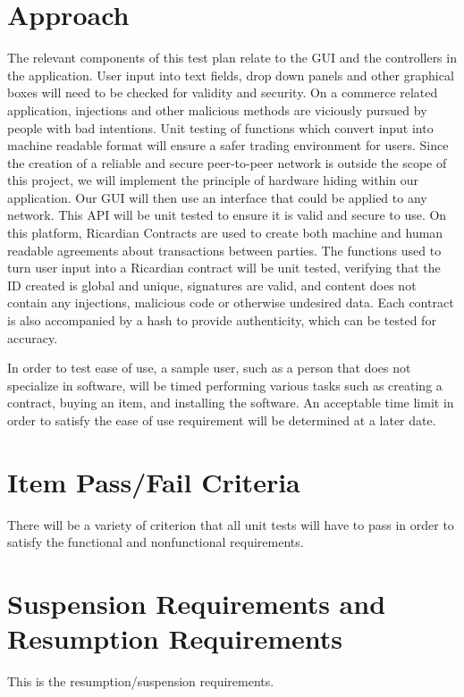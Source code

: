 \documentclass{article}
\begin{document}
\section*{Approach}
The relevant components of this test plan relate to the GUI and the controllers in the application. User input into text fields, drop down panels and other graphical boxes will need to be checked for validity and security. On a commerce related application, injections and other malicious methods are viciously pursued by people with bad intentions. Unit testing of functions which convert input into machine readable format will ensure a safer trading environment for users. Since the creation of a reliable and secure peer-to-peer network is outside the scope of this project, we will implement the principle of hardware hiding within our application. Our GUI will then use an interface that could be applied to any network. This API will be unit tested to ensure it is valid and secure to use. On this platform, Ricardian Contracts are used to create both machine and human readable agreements about transactions between parties. The functions used to turn user input into a Ricardian contract will be unit tested, verifying that the ID created is global and unique, signatures are valid, and content does not contain any injections, malicious code or otherwise undesired data. Each contract is also accompanied by a hash to provide authenticity, which can be tested for accuracy.

In order to test ease of use, a sample user, such as a person that does not specialize in software, will be timed performing various tasks such as creating a contract, buying an item, and installing the software. An acceptable time limit in order to satisfy the ease of use requirement will be determined at a later date.

\section*{Item Pass/Fail Criteria}
There will be a variety of criterion that all unit tests will have to pass in order to satisfy the functional and nonfunctional requirements.

\section*{Suspension Requirements and Resumption Requirements}
This is the resumption/suspension requirements.
\end{document}
